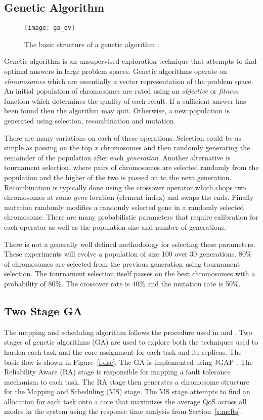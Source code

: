 \subsection{Genetic Algorithm}
\begin{figure}[h]
\centering
\texttt{[image: ga\_ov]}
\caption{The basic structure of a genetic algorithm \cite{geatbx}.}
\label{f:ga_ov}
\end{figure}

	Genetic algorithm is an unsupervised exploration technique that attempts to find optimal answers in large problem spaces. 
	Genetic algorithms operate on \emph{chromosomes} which are essentially a vector representation of the problem space.
	An initial population of chromosomes are rated using an \emph{objective} or \emph{fitness} function which determines the quality of each result. 
	If a sufficient answer has been found then the algorithm may quit.
	Otherwise, a new population is generated using selection, recombination and mutation. 
	
	There are many variations on each of these operations. Selection could be as simple as passing on the top $x$ chromosomes and then randomly generating the remainder of the population after each \emph{generation}. 
	Another alternative is tournament selection, where pairs of chromosomes are selected randomly from the population and the higher of the two is passed on to the next generation. 
	Recombination is typically done using the crossover operator which chops two chromosomes at some \emph{gene} location (element index) and swaps the ends.
	Finally mutation randomly modifies a randomly selected gene in a randomly selected chromosome.
	There are many probabilistic parameters that require calibration for each operator as well as the population size and number of generations.
	
	There is not a generally well defined methodology for selecting these parameters. These experiments will evolve a population of size 100 over 30 generations. 80\% of chromosomes are selected from the previous generation using tournament selection. The tournament selection itself passes on the best chromosomes with a probability of 80\%. The crossover rate is 40\% and the mutation rate is 50\%.

\subsection{Two Stage GA}
	The mapping and scheduling algorithm follows the procedure used in \cite{bolchini2013reliability} and \cite{kang2014reliability}. 
	Two stages of genetic algorithms (GA) are used to explore both the techniques used to harden each task and the core assignment for each task and its replicas. 
	The basic flow is shown in Figure~\ref{f:dse}. 
	The GA is implemented using JGAP \cite{jgap}.  
	The Reliability Aware (RA) stage is responsible for mapping a fault tolerance mechanism to each task. 
	The RA stage then generates a chromosome structure for the Mapping and Scheduling (MS) stage. 
	The MS stage attempts to find an allocation for each task onto a core that maximizes the average QoS across all modes in the system using the response time analysis from Section~\ref{s:mcfts}.
	
